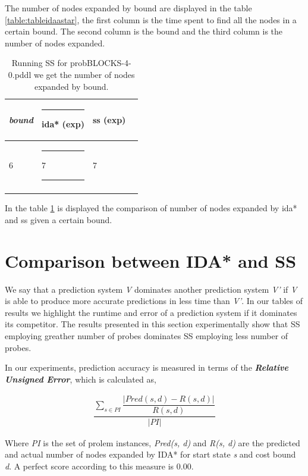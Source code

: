 \documentclass[11pt,a4paper,oneside]{report}
\begin{document}
The number of nodes expanded by bound are displayed in the table \ref{table:tableidaastar}, the first column is the time spent to find all the nodes in a certain bound. The second column is the bound and the third column is the number of nodes expanded.

\footnotesize  %
\setlength\LTleft{100pt}            %
\setlength\LTright{200pt}           %
\begin{longtable}{@{\extracolsep{\fill}} llll @{}} %
\hline
\textit{bound} &\rule{4pt}{0ex} ida* (exp) &\rule{0pt}{0ex} ss (exp) \\ \hline
6     &\rule{4pt}{0ex} 7\rule{16pt}{0ex}  & 7                    \\ \hline
\caption{Running SS for probBLOCKS-4-0.pddl we get the number of nodes expanded by bound.}
\label{table:tableidass}
\end{longtable}

In the table \ref{table:tableidass} is displayed the comparison of number of nodes expanded by ida* and ss given a certain bound.

\section{Comparison between IDA* and SS}
We say that a prediction system \textit{V} dominates another prediction system \textit{V'} if \textit{V} is able to produce more accurate predictions in less time than \textit{V'}. In our tables of results we highlight the runtime and error  of a prediction system if it dominates its competitor. The results presented in this section experimentally show that SS employing greather number of probes dominates SS employing less number of probes.
\newline

In our experiments, prediction accuracy is measured in terms of the \textit{\textbf{Relative Unsigned Error}}, which is calculated as, 

\begin{align}
\dfrac{\sum_{s \in PI} \dfrac{|Pred(s, d) - R(s, d)|}{R(s, d)}}{|PI|}
\end{align}

Where \textit{PI} is the set of prolem instances, \textit{Pred(s, d)} and \textit{R(s, d)} are the predicted and actual number of nodes expanded by IDA* for start state \textit{s} and cost bound \textit{d}. A perfect score according to this measure is 0.00.
\newline
\end{document}

